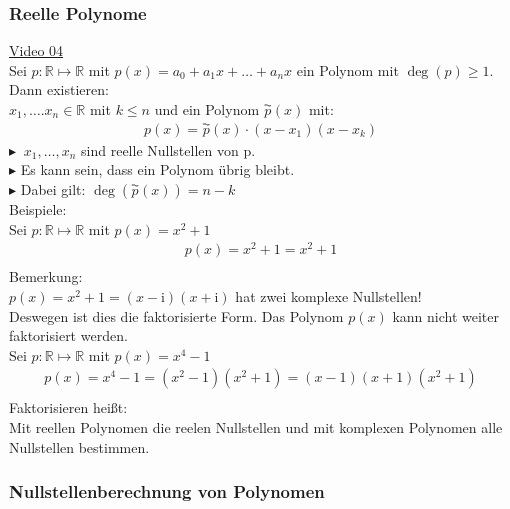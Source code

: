 \subsubsection{Reelle Polynome}
\href{https://youtu.be/yTjK64ypuI0}{Video 04}\\
Sei $ p:\mathbb{R}\longmapsto \mathbb{R} $ mit $ p(x)=a_0+a_1 x+\ldots +a_n x $ ein Polynom mit $ \deg(p)\geq 1 $.\\
Dann existieren:\\
$ x_1,\ldots.x_n\in\mathbb{R} $ mit $ k\leq n $ und ein Polynom $ \overset{\AC}{p}(x) $ mit:\\
\begin{align*}
p(x)=\overset{\AC}{p}(x)\cdot(x-x_1)(x-x_k)
\end{align*}
$\blacktriangleright\;\; x_1,\ldots,x_n $ sind reelle Nullstellen von p.\\
$ \blacktriangleright $\;\; Es kann sein, dass ein Polynom übrig bleibt.\\
$ \blacktriangleright $\;\; Dabei gilt: $ \deg( \overset{\AC}{p}(x)) =n-k$\vspace*{4mm}\\ 
Beispiele:\\
\textbullet \;\;Sei $p:\mathbb{R}\longmapsto\mathbb{R}$ mit $ p(x)=x^2+1 $\\
\begin{align*}
 p(x)=x^2+1=x^2+1\\
\end{align*}
Bemerkung:\\
$ p(x)=x^2+1=(x-\mathrm{i})(x+\mathrm{i}) $ hat zwei komplexe Nullstellen!\\
Deswegen ist dies die faktorisierte Form. Das Polynom $ p(x) $ kann nicht weiter faktorisiert werden.\vspace*{4mm}\\
\textbullet\;\; Sei $p:\mathbb{R}\longmapsto\mathbb{R}$ mit $ p(x) =x^4-1$\\
\begin{align*}
p(x) =x^4-1=(x^2-1)(x^2+1)=(x-1)(x+1)(x^2+1)\\
\end{align*}
Faktorisieren heißt:\\
Mit reellen Polynomen die reelen Nullstellen und mit komplexen Polynomen alle Nullstellen bestimmen.\\
\subsubsection{Nullstellenberechnung von Polynomen}
